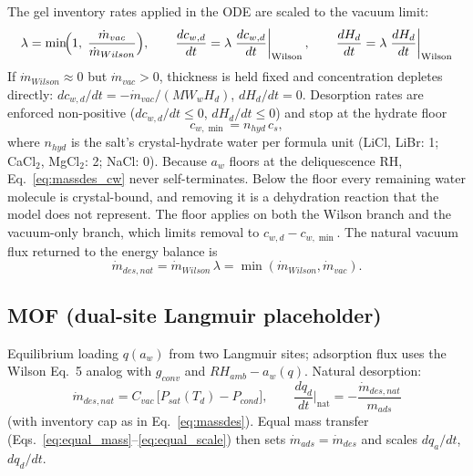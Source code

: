 \documentclass[11pt]{article}
\begin{document}
The gel inventory rates applied in the ODE are scaled to the vacuum limit:
\begin{equation}
\lambda = \min\!\Bigl(1,\; \frac{\dot{m}_{vac}}{\dot{m}_{Wilson}}\Bigr),
\qquad
\frac{dc_{w,d}}{dt} = \lambda\left.\frac{dc_{w,d}}{dt}\right|_{\mathrm{Wilson}},
\qquad
\frac{dH_d}{dt} = \lambda\left.\frac{dH_d}{dt}\right|_{\mathrm{Wilson}}
\label{eq:massdes_scale}
\end{equation}
If $\dot{m}_{Wilson} \approx 0$ but $\dot{m}_{vac} > 0$, thickness is held fixed and concentration depletes directly:
$dc_{w,d}/dt = -\dot{m}_{vac}/(MW_w H_d)$, $dH_d/dt = 0$.
Desorption rates are enforced non-positive ($dc_{w,d}/dt \le 0$, $dH_d/dt \le 0$) and stop at the hydrate floor
\begin{equation}
c_{w,\min} = n_{hyd}\,c_s,
\label{eq:hydrate_floor}
\end{equation}
where $n_{hyd}$ is the salt's crystal-hydrate water per formula unit (LiCl, LiBr: 1; CaCl$_2$, MgCl$_2$: 2; NaCl: 0). Because $a_w$ floors at the deliquescence RH, Eq.~\eqref{eq:massdes_cw} never self-terminates. Below the floor every remaining water molecule is crystal-bound, and removing it is a dehydration reaction that the model does not represent. The floor applies on both the Wilson branch and the vacuum-only branch, which limits removal to $c_{w,d} - c_{w,\min}$. The natural vacuum flux returned to the energy balance is
\begin{equation}
\dot{m}_{des,nat} = \dot{m}_{Wilson}\,\lambda = \min(\dot{m}_{Wilson}, \dot{m}_{vac}).
\label{eq:mdesnat}
\end{equation}

\subsection{MOF (dual-site Langmuir placeholder)}

Equilibrium loading $q(a_w)$ from two Langmuir sites; adsorption flux uses the Wilson Eq.~5 analog with $g_{conv}$ and $RH_{amb} - a_w(q)$. Natural desorption:
\begin{equation}
\dot{m}_{des,nat} = C_{vac}\,\bigl[P_{sat}(T_d) - P_{cond}\bigr],
\qquad
\frac{dq_d}{dt}\Big|_{\mathrm{nat}} = -\frac{\dot{m}_{des,nat}}{m_{ads}}
\end{equation}
(with inventory cap as in Eq.~\eqref{eq:massdes}). Equal mass transfer (Eqs.~\eqref{eq:equal_mass}--\eqref{eq:equal_scale}) then sets $\dot{m}_{ads}=\dot{m}_{des}$ and scales $dq_a/dt$, $dq_d/dt$.
\end{document}
